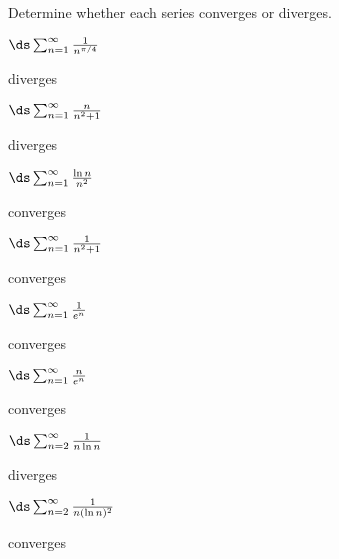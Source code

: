 \begin{enumialphparenastyle}

Determine whether each series converges or diverges.

\begin{multicols}{2}
\begin{ex}
$\ds\sum_{n=1}^\infty {1\over n^{\pi/4}}$
\begin{sol}
diverges
\end{sol}
\end{ex}

\begin{ex}
$\ds\sum_{n=1}^\infty {n\over n^2+1}$
\begin{sol}
diverges
\end{sol}
\end{ex}

\begin{ex}
$\ds\sum_{n=1}^\infty {\ln n\over n^2}$
\begin{sol}
converges
\end{sol}
\end{ex}

\begin{ex}
$\ds\sum_{n=1}^\infty {1\over n^2+1}$
\begin{sol}
converges
\end{sol}
\end{ex}

\begin{ex}
$\ds\sum_{n=1}^\infty {1\over e^n}$
\begin{sol}
converges
\end{sol}
\end{ex}

\begin{ex}
$\ds\sum_{n=1}^\infty {n\over e^n}$
\begin{sol}
converges
\end{sol}
\end{ex}

\begin{ex}
$\ds\sum_{n=2}^\infty {1\over n\ln n}$
\begin{sol}
diverges
\end{sol}
\end{ex}

\begin{ex}
$\ds\sum_{n=2}^\infty {1\over n(\ln n)^2}$
\begin{sol}
converges
\end{sol}
\end{ex}

\end{multicols}


\end{enumialphparenastyle}
